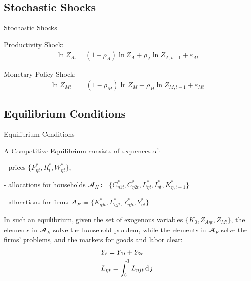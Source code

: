 \documentclass[../quali_slides.tex]{subfiles}
\begin{document}

\subsection{Stochastic Shocks}

\begin{frame}{Stochastic Shocks}
	
	Productivity Shock:
	\begin{align}
		\ln{Z_{At}} = (1-\rho_A)\ln{Z_A} + \rho_A\ln{Z_{A,t-1}} + \varepsilon_{At} \label{eq:productivity-shock}
	\end{align}
	
	Monetary Policy Shock:
	\begin{align}
		\ln{Z_{Mt}} &= (1-\rho_M)\ln{Z_{M}} + \rho_M\ln{Z_{M,t-1}} + \varepsilon_{Mt} \label{eq:monetary-shock}
	\end{align}
	
\end{frame}


\subsection{Equilibrium Conditions}

\begin{frame}{Equilibrium Conditions}
	
A Competitive Equilibrium consists of sequences of:

- prices $\{P_{\eta t}^{\ast}, R_t^{\ast}, W_{\eta t}^{\ast}\}$, 

- allocations for households $\mathbfscr{A}_H \coloneq \{C_{\eta 1 t}^{\ast}, C_{\eta 2 t}^{\ast}, L_{\eta t}^{\ast}, I_{\eta t}^{\ast}, K_{\eta, t+1}^{\ast}\}$ 

- allocations for firms $\mathbfscr{A}_F \coloneq \{K_{\eta jt}^{\ast}, L_{\eta jt}^{\ast}, Y_{\eta jt}^{\ast}, Y_{\eta t}^{\ast}\}$. 

In such an equilibrium, given the set of exogenous variables $\{K_0, Z_{A\eta t}, Z_{Mt}\}$, the elements in $\mathbfscr{A}_H$ solve the household problem, while the elements in $\mathbfscr{A}_F$ solve the firms' problems, and the markets for goods and labor clear:
\begin{align}
	& Y_{t} = Y_{1 t} + Y_{2 t} \label{eq_v2:reg-market-clearing-condition-Yt} \\
	& L_{\eta t} = \int_{0}^{1} L_{\eta jt} \operatorname{d} j \label{eq_v2:reg-market-clearing-condition-Lt} 
\end{align}
	
\end{frame}
\end{document}
